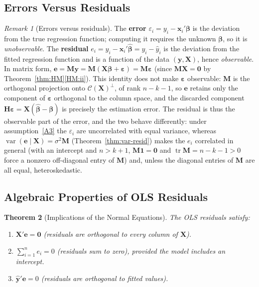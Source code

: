 \documentclass[14pt]{extarticle}
\theoremstyle{plain}
\newtheorem{theorem}{Theorem}[section]
\theoremstyle{definition}
\theoremstyle{remark}
\newtheorem{remark}[theorem]{Remark}
\DeclareMathOperator\var{var}
\DeclareMathOperator\tr{tr}
\newcommand{\bX}{\mathbf{X}}
\newcommand{\by}{\mathbf{y}}
\newcommand{\bx}{\mathbf{x}}
\def\bb{\boldsymbol{\beta}}
\newcommand{\be}{\boldsymbol{\varepsilon}}
\newcommand{\bH}{\mathbf{H}}
\newcommand{\bM}{\mathbf{M}}
\newcommand{\bone}{\mathbf{1}}
\newcommand{\bzero}{\mathbf{0}}
\newcommand{\calC}{\mathcal{C}}
\begin{document}
\subsection{Errors Versus Residuals}

\begin{remark}[Errors versus residuals]\label{rem:errors-residuals}
The \textbf{error} $\varepsilon_i = y_i - \bx_i'\bb$ is the deviation from the true regression function; computing it requires the unknown $\bb$, so it is \emph{unobservable}. The \textbf{residual} $e_i = y_i - \bx_i'\hat{\bb} = y_i - \hat{y}_i$ is the deviation from the fitted regression function and is a function of the data $(\by, \bX)$, hence \emph{observable}. In matrix form, $\mathbf{e} = \bM\by = \bM(\bX\bb + \be) = \bM\be$ (since $\bM\bX = \bzero$ by Theorem~\ref{thm:HM}\ref{HM:ii}). This identity does not make $\be$ observable: $\bM$ is the orthogonal projection onto $\calC(\bX)^\perp$, of rank $n-k-1$, so $\mathbf{e}$ retains only the component of $\be$ orthogonal to the column space, and the discarded component $\bH\be = \bX(\hat{\bb} - \bb)$ is precisely the estimation error. The residual is thus the observable part of the error, and the two behave differently: under assumption~\ref{A3} the $\varepsilon_i$ are uncorrelated with equal variance, whereas $\var(\mathbf{e} \mid \bX) = \sigma^2\bM$ (Theorem~\ref{thm:var-resid}) makes the $e_i$ correlated in general (with an intercept and $n > k+1$, $\bM\bone = \bzero$ and $\tr\bM = n-k-1 > 0$ force a nonzero off-diagonal entry of $\bM$) and, unless the diagonal entries of $\bM$ are all equal, heteroskedastic.
\end{remark}

\subsection{Algebraic Properties of OLS Residuals}

\begin{theorem}[Implications of the Normal Equations]\label{thm:normal-eq}
The OLS residuals satisfy:
\begin{enumerate}[label=\textup{(\roman*)}]
\item\label{ne:i} $\bX'\mathbf{e} = \bzero$ (residuals are orthogonal to every column of $\bX$).
\item\label{ne:ii} $\sum_{i=1}^{n} e_i = 0$ (residuals sum to zero), provided the model includes an intercept.
\item\label{ne:iii} $\hat{\by}'\mathbf{e} = 0$ (residuals are orthogonal to fitted values).
\end{enumerate}
\end{theorem}
\end{document}
